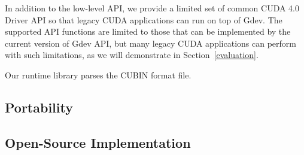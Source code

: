 In addition to the low-level API, we provide a limited set of common
CUDA 4.0 Driver API so that legacy CUDA applications can run on top of
Gdev.
The supported API functions are limited to those that can be implemented
by the current version of Gdev API, but many legacy CUDA applications
can perform with such limitations, as we will demonstrate in
Section~\ref{evaluation}.

Our runtime library parses the CUBIN format file.

\subsection{Portability}

\subsection{Open-Source Implementation}


